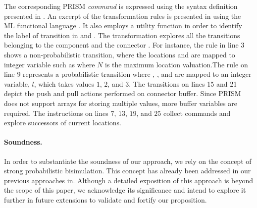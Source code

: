  The corresponding PRISM \emph{command}  is expressed using the syntax definition presented in . An excerpt of the transformation rules is presented in   using the ML functional language \cite{harper2001}. It also employs a utility function  in order to identify the label of transition in  and . The transformation explores all the transitions  belonging to the component  and the connector . For instance, the rule in line $3$ shows a non-probabilistic transition, where the locations  and   are mapped to integer variable  such as  where $N$ is the maximum location valuation.The rule on line $9$ represents a probabilistic transition where , , and  are mapped to an integer variable, $l$, which takes values $1$, $2$, and $3$. The transitions on lines 15 and 21 depict the push and pull actions performed on connector  buffer. Since PRISM does not support arrays for storing multiple values, more buffer variables are required. The instructions on lines $7$, $13$, $19$, and $25$ collect commands and explore successors of current locations.
 
 \paragraph*{Soundness.} In order to substantiate the soundness of our approach, we rely on the concept of strong probabilistic bisimulation. This concept has already been addressed in our previous approaches in\cite{baouyaquantitative2015}. Although a detailed exposition of this approach is beyond the scope of this paper, we acknowledge its significance and intend to explore it further in future extensions to validate and fortify our proposition.